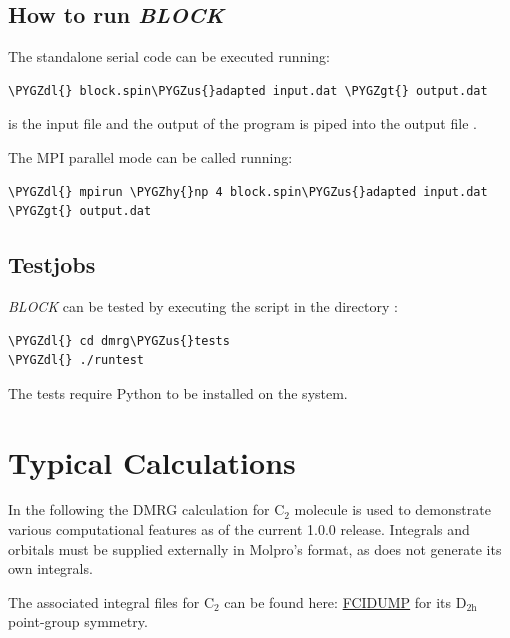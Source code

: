 \documentclass[letterpaper,10pt,english]{sphinxmanual}
\def\PYGZus{\char`\_}
\def\PYGZgt{\char`\>}
\def\PYGZdl{\char`\$}
\def\PYGZhy{\char`\-}
\begin{document}
\subsection{How to run \emph{BLOCK}}
\label{build:how-to-run-block}
The standalone serial code can be executed running:

\begin{Verbatim}[commandchars=\\\{\}]
\PYGZdl{} block.spin\PYGZus{}adapted input.dat \PYGZgt{} output.dat
\end{Verbatim}

 is the input file and the output of the program is piped into the output file .

The MPI parallel mode can be called running:

\begin{Verbatim}[commandchars=\\\{\}]
\PYGZdl{} mpirun \PYGZhy{}np 4 block.spin\PYGZus{}adapted input.dat \PYGZgt{} output.dat
\end{Verbatim}


\subsection{Testjobs}
\label{build:testjobs}
\emph{BLOCK} can be tested by executing the script in the directory :

\begin{Verbatim}[commandchars=\\\{\}]
\PYGZdl{} cd dmrg\PYGZus{}tests
\PYGZdl{} ./runtest
\end{Verbatim}

The tests require Python to be installed on the system.


\section{Typical Calculations}
\label{examples:typical-calculations}\label{examples::doc}
In the following the DMRG calculation for C$_{\text{2}}$ molecule is used to demonstrate various computational features as of the current 1.0.0 release.
Integrals and orbitals must be supplied externally in Molpro's  format, as  does not generate its own integrals.

The associated integral files for C$_{\text{2}}$ can be found here: \href{https://raw.githubusercontent.com/sanshar/Block/master/README\_Examples/FCIDUMP}{FCIDUMP}
for its D$_{\text{2h}}$ point-group symmetry.
\end{document}
